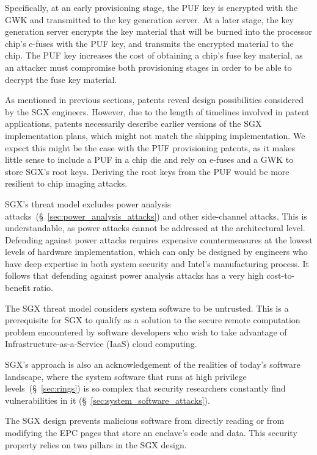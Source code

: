 Specifically, at an early provisioning stage, the PUF key is encrypted with the
GWK and transmitted to the key generation server. At a later stage, the key
generation server encrypts the key material that will be burned into the
processor chip's e-fuses with the PUF key, and transmits the encrypted material
to the chip. The PUF key increases the cost of obtaining a chip's fuse key
material, as an attacker must compromise both provisioning stages in order to
be able to decrypt the fuse key material.

As mentioned in previous sections, patents reveal design possibilities
considered by the SGX engineers. However, due to the length of timelines involved
in patent applications, patents necessarily describe earlier versions of the
SGX implementation plans, which might not match the shipping implementation. We
expect this might be the case with the PUF provisioning patents, as it makes
little sense to include a PUF in a chip die and rely on e-fuses and a GWK to
store SGX's root keys. Deriving the root keys from the PUF would be more
resilient to chip imaging attacks.

SGX's threat model excludes power analysis
attacks~(\S~\ref{sec:power_analysis_attacks}) and other side-channel attacks.
This is understandable, as power attacks cannot be addressed at the
architectural level. Defending against power attacks requires expensive
countermeasures at the lowest levels of hardware implementation, which can only
be designed by engineers who have deep expertise in both system security and
Intel's manufacturing process. It follows that defending against power analysis
attacks has a very high cost-to-benefit ratio.


\label{sec:sgx_vs_privileged_sw_attacks}

The SGX threat model considers system software to be untrusted. This is a
prerequisite for SGX to qualify as a solution to the secure remote computation
problem encountered by software developers who wish to take advantage of
Infrastructure-as-a-Service (IaaS) cloud computing.

SGX's approach is also an acknowledgement of the realities of today's software
landscape, where the system software that runs at high privilege
levels~(\S~\ref{sec:rings}) is so complex that security researchers constantly
find vulnerabilities in it (\S~\ref{sec:system_software_attacks}).

The SGX design prevents malicious software from directly reading or from
modifying the EPC pages that store an enclave's code and data. This security
property relies on two pillars in the SGX design.

